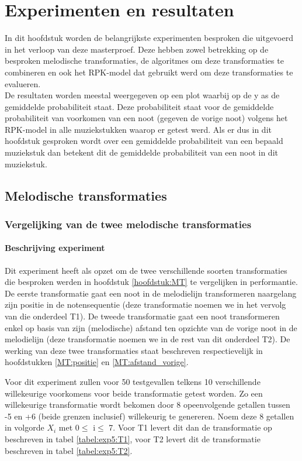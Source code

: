 \chapter{Experimenten en resultaten}
\label{hoofdstuk:ER}
In dit hoofdstuk worden de belangrijkste experimenten besproken die uitgevoerd in het verloop van deze masterproef. Deze hebben zowel betrekking op de besproken melodische transformaties, de algoritmes om deze transformaties te combineren en ook het RPK-model dat gebruikt werd om deze transformaties te evalueren.\\
De resultaten worden meestal weergegeven op een plot waarbij op de y as de gemiddelde probabiliteit staat. Deze probabiliteit staat voor de gemiddelde probabiliteit van voorkomen van een noot (gegeven de vorige noot) volgens het RPK-model in alle muziekstukken waarop er getest werd. Als er dus in dit hoofdstuk gesproken wordt over een gemiddelde probabiliteit van een bepaald muziekstuk dan betekent dit de gemiddelde probabiliteit van een noot in dit muziekstuk.

\section{Melodische transformaties}
\subsection{Vergelijking van de twee melodische transformaties}
\label{experiment:5}
\subsubsection{Beschrijving experiment}
Dit experiment heeft als opzet om de twee verschillende soorten transformaties die besproken werden in hoofdstuk \ref{hoofdstuk:MT} te vergelijken in performantie. De eerste transformatie gaat een noot in de melodielijn transformeren naargelang zijn positie in de notensequentie (deze transformatie noemen we in het vervolg van die onderdeel T1). De tweede transformatie gaat een noot transformeren enkel op basis van zijn (melodische) afstand ten opzichte van de vorige noot in de melodielijn (deze transformatie noemen we in de rest van dit onderdeel T2). De werking van deze twee transformaties staat beschreven respectievelijk in hoofdstukken \ref{MT:positie} en \ref{MT:afstand_vorige}.

Voor dit experiment zullen voor 50 testgevallen telkens 10 verschillende willekeurige voorkomens voor beide transformatie getest worden. Zo een willekeurige transformatie wordt bekomen door 8 opeenvolgende getallen tussen -5 en +6 (beide grenzen inclusief) willekeurig te genereren. Noem deze 8 getallen in volgorde $X_{i}$ met 0$\leq$ i$\leq$ 7. Voor T1 levert dit dan de transformatie op beschreven in tabel \ref{tabel:exp5:T1}, voor T2 levert dit de transformatie beschreven in tabel \ref{tabel:exp5:T2}.

